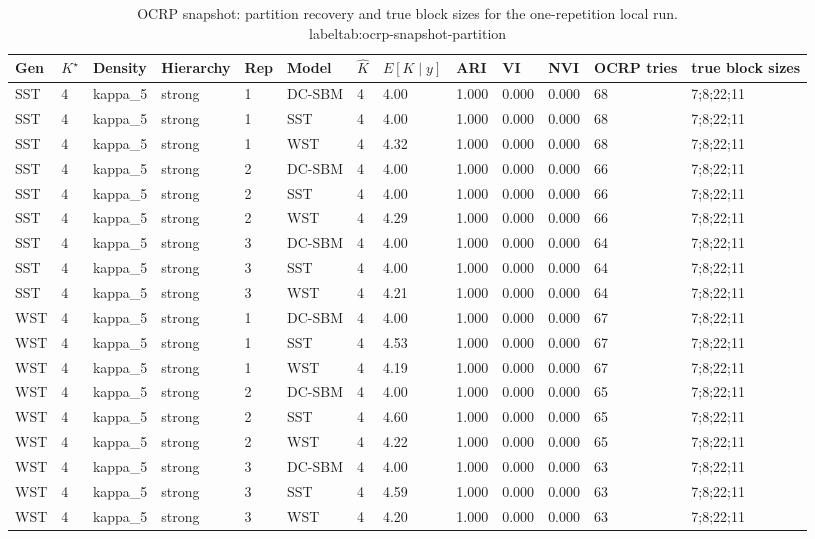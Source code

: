 \begin{table}[!h]
\centering
\caption{OCRP snapshot: partition recovery and true block sizes for the one-repetition local run.\\label{tab:ocrp-snapshot-partition}}
\centering
\begin{tabular}[t]{lllllllllllll}
\toprule
Gen & $K^\star$ & Density & Hierarchy & Rep & Model & $\hat K$ & $E[K\mid y]$ & ARI & VI & NVI & OCRP tries & true block sizes\\
\midrule
SST & 4 & kappa_5 & strong & 1 & DC-SBM & 4 & 4.00 & 1.000 & 0.000 & 0.000 & 68 & 7;8;22;11\\
SST & 4 & kappa_5 & strong & 1 & SST & 4 & 4.00 & 1.000 & 0.000 & 0.000 & 68 & 7;8;22;11\\
SST & 4 & kappa_5 & strong & 1 & WST & 4 & 4.32 & 1.000 & 0.000 & 0.000 & 68 & 7;8;22;11\\
SST & 4 & kappa_5 & strong & 2 & DC-SBM & 4 & 4.00 & 1.000 & 0.000 & 0.000 & 66 & 7;8;22;11\\
SST & 4 & kappa_5 & strong & 2 & SST & 4 & 4.00 & 1.000 & 0.000 & 0.000 & 66 & 7;8;22;11\\
SST & 4 & kappa_5 & strong & 2 & WST & 4 & 4.29 & 1.000 & 0.000 & 0.000 & 66 & 7;8;22;11\\
SST & 4 & kappa_5 & strong & 3 & DC-SBM & 4 & 4.00 & 1.000 & 0.000 & 0.000 & 64 & 7;8;22;11\\
SST & 4 & kappa_5 & strong & 3 & SST & 4 & 4.00 & 1.000 & 0.000 & 0.000 & 64 & 7;8;22;11\\
SST & 4 & kappa_5 & strong & 3 & WST & 4 & 4.21 & 1.000 & 0.000 & 0.000 & 64 & 7;8;22;11\\
WST & 4 & kappa_5 & strong & 1 & DC-SBM & 4 & 4.00 & 1.000 & 0.000 & 0.000 & 67 & 7;8;22;11\\
WST & 4 & kappa_5 & strong & 1 & SST & 4 & 4.53 & 1.000 & 0.000 & 0.000 & 67 & 7;8;22;11\\
WST & 4 & kappa_5 & strong & 1 & WST & 4 & 4.19 & 1.000 & 0.000 & 0.000 & 67 & 7;8;22;11\\
WST & 4 & kappa_5 & strong & 2 & DC-SBM & 4 & 4.00 & 1.000 & 0.000 & 0.000 & 65 & 7;8;22;11\\
WST & 4 & kappa_5 & strong & 2 & SST & 4 & 4.60 & 1.000 & 0.000 & 0.000 & 65 & 7;8;22;11\\
WST & 4 & kappa_5 & strong & 2 & WST & 4 & 4.22 & 1.000 & 0.000 & 0.000 & 65 & 7;8;22;11\\
WST & 4 & kappa_5 & strong & 3 & DC-SBM & 4 & 4.00 & 1.000 & 0.000 & 0.000 & 63 & 7;8;22;11\\
WST & 4 & kappa_5 & strong & 3 & SST & 4 & 4.59 & 1.000 & 0.000 & 0.000 & 63 & 7;8;22;11\\
WST & 4 & kappa_5 & strong & 3 & WST & 4 & 4.20 & 1.000 & 0.000 & 0.000 & 63 & 7;8;22;11\\
\bottomrule
\end{tabular}
\end{table}

